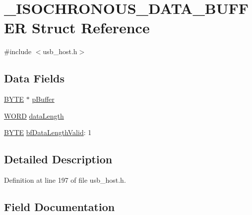\hypertarget{struct___i_s_o_c_h_r_o_n_o_u_s___d_a_t_a___b_u_f_f_e_r}{}\section{\+\_\+\+I\+S\+O\+C\+H\+R\+O\+N\+O\+U\+S\+\_\+\+D\+A\+T\+A\+\_\+\+B\+U\+F\+F\+E\+R Struct Reference}
\label{struct___i_s_o_c_h_r_o_n_o_u_s___d_a_t_a___b_u_f_f_e_r}


{\ttfamily \#include $<$usb\+\_\+host.\+h$>$}

\subsection*{Data Fields}
\begin{DoxyCompactItemize}
\item 
\hyperlink{_generic_type_defs_8h_a4ae1dab0fb4b072a66584546209e7d58}{B\+Y\+T\+E} $\ast$ \hyperlink{struct___i_s_o_c_h_r_o_n_o_u_s___d_a_t_a___b_u_f_f_e_r_a81bba27029571d8801e39f24898ddaa0}{p\+Buffer}
\item 
\hyperlink{_generic_type_defs_8h_a2b0e863dadf920709ec53d9088ee7c91}{W\+O\+R\+D} \hyperlink{struct___i_s_o_c_h_r_o_n_o_u_s___d_a_t_a___b_u_f_f_e_r_a0398f1b8d05aedd831ce3c1b79500b5f}{data\+Length}
\item 
\hyperlink{_generic_type_defs_8h_a4ae1dab0fb4b072a66584546209e7d58}{B\+Y\+T\+E} \hyperlink{struct___i_s_o_c_h_r_o_n_o_u_s___d_a_t_a___b_u_f_f_e_r_aceafa556fbaf1fef5d03393c9d150fec}{bf\+Data\+Length\+Valid}\+: 1
\end{DoxyCompactItemize}


\subsection{Detailed Description}


Definition at line 197 of file usb\+\_\+host.\+h.



\subsection{Field Documentation}
\hypertarget{struct___i_s_o_c_h_r_o_n_o_u_s___d_a_t_a___b_u_f_f_e_r_aceafa556fbaf1fef5d03393c9d150fec}{}
